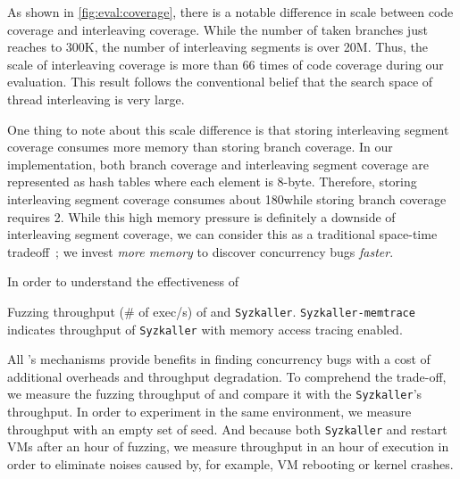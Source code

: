 As shown in \autoref{fig:eval:coverage}, there is a notable difference
in scale between code coverage and interleaving coverage.
%
While the number of taken branches just reaches to 300K, the number of
interleaving segments is over 20M. Thus, the scale of interleaving
coverage is more than 66 times of code coverage during our evaluation.
%
This result follows the conventional belief that the search space of
thread interleaving is very large.

One thing to note about this scale difference is that storing
interleaving segment coverage consumes more memory than storing branch
coverage.
%
In our implementation, both branch coverage and interleaving segment
coverage are represented as hash tables where each element is
8-byte. Therefore, storing interleaving segment coverage consumes
about 180\MB while storing branch coverage requires 2\MB.
%
While this high memory pressure is definitely a downside of
interleaving segment coverage, we can consider this as a traditional
space-time tradeoff~\cite{spacetimetradeoff}; we invest \textit{more
  memory} to discover concurrency bugs \textit{faster}.
%


%
In order to understand the effectiveness of \dr{}



%
\begin{table}[t]
  \small
  \centering
  
  \caption{Fuzzing throughput (\# of exec/s) of \sys and
    \texttt{Syzkaller}. \texttt{Syzkaller-memtrace} indicates
    throughput of \texttt{Syzkaller} with memory access tracing
    enabled.}
  \label{table:throughput}
\end{table}
%
All \sys's mechanisms provide benefits in finding concurrency bugs
with a cost of additional overheads and throughput degradation.
%
To comprehend the trade-off, we measure the fuzzing throughput of \sys
and compare it with the \texttt{Syzkaller}'s throughput.
%
In order to experiment in the same environment, we measure throughput
with an empty set of seed. And because both \texttt{Syzkaller} and
\sys restart VMs after an hour of fuzzing, we measure throughput in an
hour of execution in order to eliminate noises caused by, for example,
VM rebooting or kernel crashes.



